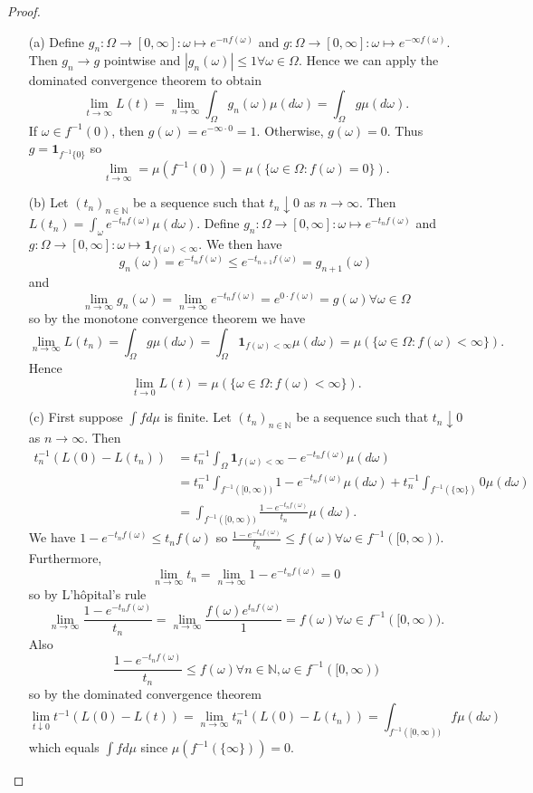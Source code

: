 \documentclass{article}
\begin{document}
\begin{proof}
\begin{enumerate}
    \item[(a)] Define $g_n:\Omega\to[0,\infty]:\omega\mapsto e^{-nf(\omega)}$ and $g:\Omega\to[0,\infty]:\omega\mapsto e^{-\infty f(\omega)}$. Then $g_n\to g$ pointwise and $|g_n(\omega)|\leq 1\forall\omega\in\Omega$. Hence we can apply the dominated convergence theorem to obtain \[\lim_{t\to\infty}L(t)=\lim_{n\to\infty}\int_{\Omega}g_n(\omega)\mu(d\omega)=\int_{\Omega}g\mu(d\omega).\] If $\omega\in f^{-1}(0)$, then $g(\omega)=e^{-\infty\cdot 0}=1$. Otherwise, $g(\omega)=0$. Thus $g=\mathbf{1}_{f^{-1}\{0\}}$ so \[\lim_{t\to\infty}=\mu(f^{-1}(0))=\mu(\{\omega\in\Omega:f(\omega)=0\}).\]
    \item[(b)] Let $(t_n)_{n\in\mathbb{N}}$ be a sequence such that $t_n\downarrow0$ as $n\to\infty$. Then $L(t_n)=\int_{\omega}e^{-t_nf(\omega)}\mu(d\omega)$. Define $g_n:\Omega\to[0,\infty]:\omega\mapsto e^{-t_nf(\omega)}$ and $g:\Omega\to[0,\infty]:\omega\mapsto\mathbf{1}_{f(\omega)<\infty}$. We then have \[g_n(\omega)=e^{-t_nf(\omega)}\leq e^{-t_{n+1}f(\omega)}=g_{n+1}(\omega)\] and \[\lim_{n\to\infty}g_n(\omega)=\lim_{n\to\infty}e^{-t_nf(\omega)}=e^{0\cdot f(\omega)}=g(\omega)\forall \omega\in \Omega\] so by the monotone convergence theorem we have \[\lim_{n\to\infty}L(t_n)=\int_{\Omega}g\mu(d\omega)=\int_{\Omega}\mathbf{1}_{f(\omega)<\infty}\mu(d\omega)=\mu(\{\omega\in\Omega:f(\omega)<\infty\}).\] Hence \[\lim_{t\to0}L(t)=\mu(\{\omega\in\Omega:f(\omega)<\infty\}).\]
    \item[(c)] First suppose $\int fd\mu$ is finite. Let $(t_n)_{n\in\mathbb{N}}$ be a sequence such that $t_n\downarrow0$ as $n\to\infty$. Then \begin{align*}t_n^{-1}(L(0)-L(t_n))&=t_n^{-1}\int_\Omega \mathbf{1}_{f(\omega)<\infty}-e^{-t_nf(\omega)}\mu(d\omega)\\&=t_n^{-1}\int_{f^{-1}([0,\infty))}1-e^{-t_nf(\omega)}\mu(d\omega)+t_n^{-1}\int_{f^{-1}(\{\infty\})}0\mu(d\omega)\\&=\int_{f^{-1}([0,\infty))}\frac{1-e^{-t_nf(\omega)}}{t_n}\mu(d\omega).\end{align*} We have $1-e^{-t_nf(\omega)}\leq t_nf(\omega)$ so $\frac{1-e^{-t_nf(\omega)}}{t_n}\leq f(\omega)\forall\omega\in f^{-1}([0,\infty))$. Furthermore, \[\lim_{n\to\infty}t_n=\lim_{n\to\infty}1-e^{-t_nf(\omega)}=0\] so by L'hôpital's rule \[\lim_{n\to\infty}\frac{1-e^{-t_nf(\omega)}}{t_n}=\lim_{n\to\infty}\frac{f(\omega)e^{t_nf(\omega)}}{1}=f(\omega)\forall\omega\in f^{-1}([0,\infty)).\] Also \[\frac{1-e^{-t_nf(\omega)}}{t_n}\leq f(\omega)\forall n\in\mathbb{N},\omega\in f^{-1}([0,\infty))\] so by the dominated convergence theorem \[\lim_{t\downarrow0}t^{-1}(L(0)-L(t))=\lim_{n\to\infty}t_n^{-1}(L(0)-L(t_n))=\int_{f^{-1}([0,\infty))}f\mu(d\omega)\]which equals $\int fd\mu$ since $\mu(f^{-1}(\{\infty\}))=0$.
\end{enumerate}
\end{proof}
\end{document}
